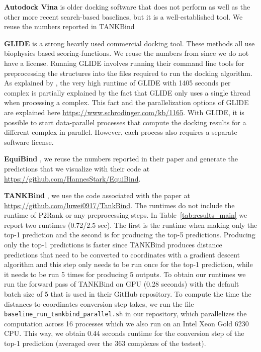 \documentclass{article} \usepackage{iclr2023_conference,times}
\newcommand{\new}[1]{#1}
\begin{document}
\new{\textbf{Autodock Vina} \citep{trott2010autodock} is older docking software that does not perform as well as the other more recent search-based baselines, but it is a well-established tool. We reuse the numbers reported in TANKBind \citep{Lu2022TankBind}}


\textbf{GLIDE} \citep{halgren2004glide} is a strong heavily used commercial docking tool. These methods all use biophysics based scoring-functions. We reuse the numbers from \citet{equibind} since we do not have a license. \new{Running GLIDE involves running their command line tools for preprocessing the structures into the files required to run the docking algorithm.} As explained by \citet{equibind}, the very high runtime of GLIDE with 1405 seconds per complex is partially explained by the fact that GLIDE only uses a single thread when processing a complex. This fact and the parallelization options of GLIDE are explained here \url{https://www.schrodinger.com/kb/1165}. With GLIDE, it is possible to start data-parallel processes that compute the docking results for a different complex in parallel. However, each process also requires a separate software license. 


\textbf{EquiBind} \citep{equibind}, we reuse the numbers reported in their paper and generate the predictions that we visualize with their code at \url{https://github.com/HannesStark/EquiBind}.

\textbf{TANKBind} \citep{Lu2022TankBind}, we use the code associated with the paper at \url{https://github.com/luwei0917/TankBind}. The runtimes do not include the runtime of P2Rank or any preprocessing steps. In Table~\ref{tab:results_main} we report two runtimes (0.72/2.5 sec). The first is the runtime when making only the top-1 prediction and the second is for producing the top-5 predictions. Producing only the top-1 predictions is faster since TANKBind produces distance predictions that need to be converted to coordinates with a gradient descent algorithm and this step only needs to be run once for the top-1 prediction, while it needs to be run 5 times for producing 5 outputs. To obtain our runtimes we run the forward pass of TANKBind on GPU (0.28 seconds) with the default batch size of 5 that is used in their GitHub repository. To compute the time the distances-to-coordinates conversion step takes, we run the file \texttt{baseline\_run\_tankbind\_parallel.sh} in our repository, which parallelizes the computation across 16 processes which we also run on an Intel Xeon Gold 6230 CPU. This way, we obtain 0.44 seconds runtime for the conversion step of the top-1 prediction (averaged over the 363 complexes of the testset). 
\end{document}
